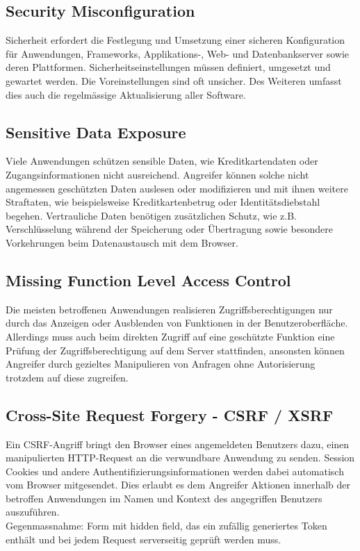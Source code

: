 \subsection{Security Misconfiguration}
Sicherheit erfordert die Festlegung und Umsetzung einer sicheren Konfiguration für Anwendungen, Frameworks, Applikations-, Web- und Datenbankserver sowie deren Plattformen. Sicherheitseinstellungen müssen definiert, umgesetzt und gewartet werden. Die Voreinstellungen sind oft unsicher. Des Weiteren umfasst dies auch die regelmässige Aktualisierung aller Software.

\subsection{Sensitive Data Exposure}
Viele Anwendungen schützen sensible Daten, wie Kreditkartendaten oder Zugangsinformationen nicht ausreichend. Angreifer können solche nicht angemessen geschützten Daten auslesen oder modifizieren und mit ihnen weitere Straftaten, wie beispielsweise Kreditkartenbetrug oder Identitätsdiebstahl begehen. Vertrauliche Daten benötigen zusätzlichen Schutz, wie z.B. Verschlüsselung während der Speicherung oder Übertragung sowie besondere Vorkehrungen beim Datenaustausch mit dem Browser.

\subsection{Missing Function Level Access Control}
Die meisten betroffenen Anwendungen realisieren Zugriffsberechtigungen nur durch das Anzeigen oder Ausblenden von Funktionen in der Benutzeroberfläche. Allerdings muss auch beim direkten Zugriff auf eine geschützte Funktion eine Prüfung der Zugriffsberechtigung auf dem Server stattfinden, ansonsten können Angreifer durch gezieltes Manipulieren von Anfragen ohne Autorisierung trotzdem auf diese zugreifen.

\subsection{Cross-Site Request Forgery - CSRF / XSRF}
Ein CSRF-Angriff bringt den Browser eines angemeldeten Benutzers dazu, einen manipulierten HTTP-Request an die verwundbare Anwendung zu senden. Session Cookies und andere Authentifizierungsinformationen werden dabei automatisch vom Browser mitgesendet. Dies erlaubt es dem Angreifer Aktionen innerhalb der betroffen Anwendungen im Namen und Kontext des angegriffen Benutzers auszuführen.\\
Gegenmassnahme: Form mit hidden field, das ein zufällig generiertes Token enthält und bei jedem Request serverseitig geprüft werden muss.

